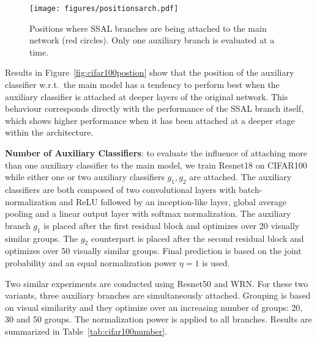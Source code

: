 \documentclass[10pt,twocolumn,letterpaper]{article}
\begin{document}
\begin{figure}[t]
\centering
    \texttt{[image: figures/positionsarch.pdf]}
	\caption{Positions where SSAL branches are being attached to the main network (red circles). Only one auxiliary branch is evaluated at a time.}
	\label{fig:attachmentpoints}
\end{figure}


Results in Figure~\ref{fig:cifar100postion} show that the position of the auxiliary classifier w.r.t.~the main model has a tendency to perform best when the auxiliary classifier is attached at deeper layers of the original network.
This behaviour corresponds directly with the performance of the SSAL branch itself, which shows higher performance when it has been attached at a deeper stage within the architecture.



\textbf{Number of Auxiliary Classifiers}: to evaluate the influence of attaching more than one auxiliary classifier to the main model, we train Resnet18 on CIFAR100 while either one or two auxiliary classifiers $g_1, g_2$ are attached.
The auxiliary classifiers are both composed of two convolutional layers with batch-normalization and ReLU followed by an inception-like layer, global average pooling and a linear output layer with softmax normalization.
The auxiliary branch $g_1$ is placed after the first residual block and optimizes over 20 visually similar groups.
The $g_2$ counterpart is placed after the second residual block and optimizes over 50 visually similar groups.
Final prediction is based on the joint probability and an equal normalization power $\eta = 1$ is used.

Two similar experiments are conducted using Resnet50 and WRN.
For these two variants, three auxiliary branches are simultaneously attached.
Grouping is based on visual similarity and they optimize over an increasing number of groups: 20, 30 and 50 groups.
The normalization power is applied to all branches.
Results are summarized in Table~\ref{tab:cifar100number}.
\end{document}
